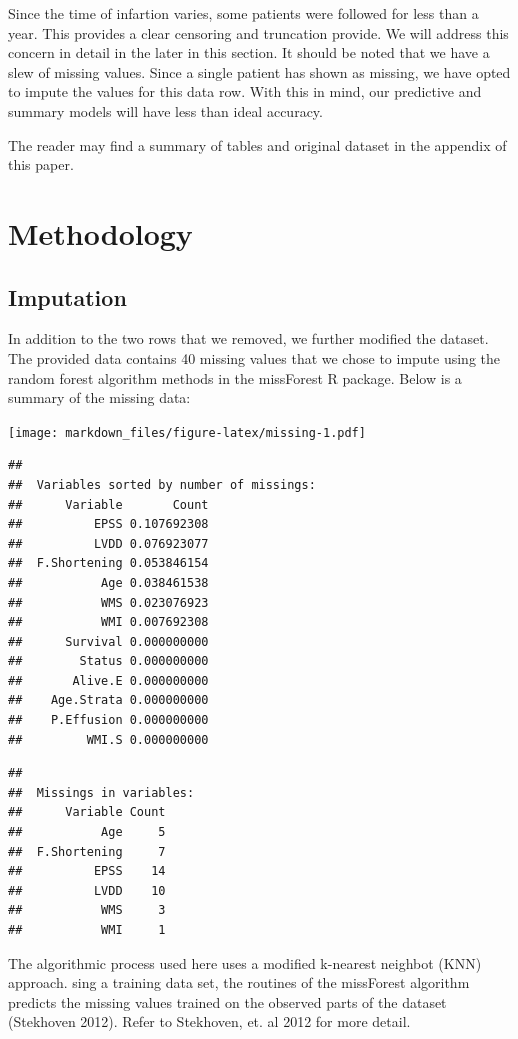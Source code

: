 \documentclass[
]{article}
\begin{document}
Since the time of infartion varies, some patients were followed for less
than a year. This provides a clear censoring and truncation provide. We
will address this concern in detail in the later in this section. It
should be noted that we have a slew of missing values. Since a single
patient has shown as missing, we have opted to impute the values for
this data row. With this in mind, our predictive and summary models will
have less than ideal accuracy.

The reader may find a summary of tables and original dataset in the
appendix of this paper.

\hypertarget{methodology}{%
\section{Methodology}\label{methodology}}

\hypertarget{imputation}{%
\subsection{Imputation}\label{imputation}}

In addition to the two rows that we removed, we further modified the
dataset. The provided data contains 40 missing values that we chose to
impute using the random forest algorithm methods in the missForest R
package. Below is a summary of the missing data:

\texttt{[image: markdown\_files/figure-latex/missing-1.pdf]}

\begin{verbatim}
## 
##  Variables sorted by number of missings: 
##      Variable       Count
##          EPSS 0.107692308
##          LVDD 0.076923077
##  F.Shortening 0.053846154
##           Age 0.038461538
##           WMS 0.023076923
##           WMI 0.007692308
##      Survival 0.000000000
##        Status 0.000000000
##       Alive.E 0.000000000
##    Age.Strata 0.000000000
##    P.Effusion 0.000000000
##         WMI.S 0.000000000
\end{verbatim}

\begin{verbatim}
## 
##  Missings in variables:
##      Variable Count
##           Age     5
##  F.Shortening     7
##          EPSS    14
##          LVDD    10
##           WMS     3
##           WMI     1
\end{verbatim}

The algorithmic process used here uses a modified k-nearest neighbot
(KNN) approach. sing a training data set, the routines of the missForest
algorithm predicts the missing values trained on the observed parts of
the dataset (Stekhoven 2012). Refer to Stekhoven, et. al 2012 for more
detail.
\end{document}

